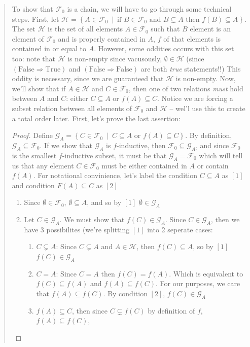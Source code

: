 \documentclass[oneside]{book}
\newcommand{\CG}{\mathcal{G}}
\newcommand{\CH}{\mathcal{H}}
\newcommand{\ff}{\mathscr{F}}
\newcommand{\sse}{\subseteq}
\newcommand{\ssne}{\subsetneq}
\newcommand{\Rw}{\Rightarrow}
\newcommand{\set}[2]{\left\{#1 \ \middle|\ #2\right\}}
\begin{document}
\begin{Proof}
\begin{quote}
\begin{enumerate}
				To show that $\ff_0$ is a chain, we will have to go through some technical steps. First, let $\CH
				= \set{A \in \ff_0}{\text{if $B \in \ff_0$ and $B \ssne A$ then $f(B) \sse A$}}$. The set $\CH$ is the set
				of all elements $A\in \ff_0$ such that $B$ element is an element of $\ff_0$ and is properly contained in $A$, $f$ of that elements is
				contained in or equal to $A$. However, some oddities occurs with this set too: note that $\CH$ is
				non-empty since vacusously, $\emptyset \in \CH$ (since $(\text{False} \Rw \text{True})$ and $(\text{False}
				\Rw \text{False})$ are both \emph{true} statements!!) This oddity is necessary, since we are guaranteed
				that $\CH$ is non-empty. Now, we'll show that if $A \in \CH$ and $C \in \ff_0$, then one of two
				relations \emph{must} hold between $A$ and $C$: either $C \sse A$ or $f(A) \sse C$. Notice we are
				forcing a subset relation between all elements of $\ff_0$ and $\CH$ -- wel'l use this to create a total
				order later. First, let's prove the last assertion:
				\begin{proof}
					Define $\CG_A = \set{C \in \ff_0}{C \sse A\text{ or }f(A) \sse C}$. By definition, $\CG_A \sse
					\ff_0$. If we show that $\CG_A$ is $f$-inductive, then $\ff_0 \sse \CG_A$, and since $\ff_0$ is the
					smallest $f$-inductive subset, it must be that $\CG_A = \ff_0$ which will tell us that any element
					$C \in \ff_0$ must be either contained in $A$ or contain $f(A)$. For notational convinience, let's label the
					condition $C \sse A$ as $[1]$ and condition $F(A) \sse C$ as $[2]$
					\begin{enumerate}
						\item Since $\emptyset \in \ff_0$, $\emptyset \sse A$, and so by $[1]$ $\emptyset \in \CG_A$
						\item Let $C \in \CG_A$. We must show that $f(C) \in \CG_A$. Since $C \in \CG_A$, then we have
							3 possibilites (we're splitting $[1]$ into 2 seperate cases:
							\begin{enumerate}
								\item $C \ssne A$: Since $C\ssne A$ and $A \in \CH$, then $f(C) \sse A$, so by $[1]$
									$f(C) \in \CG_A$
								\item $C = A$: Since $C = A$ then $f(C) = f(A)$. Which is equivalent to $f(C) \sse f(A)$
									and $f(A) \sse f(C)$. For our purposes, we care that $f(A) \sse f(C)$. By
									condition $[2]$, $f(C) \in \CG_A$
								\item $f(A) \sse C$, then since $C \ssne f(C)$ by definition of $f$, $f(A) \sse f(C)$,

\end{enumerate}
\end{enumerate}
\end{proof}
\end{enumerate}
\end{quote}
\end{Proof}
\end{document}
